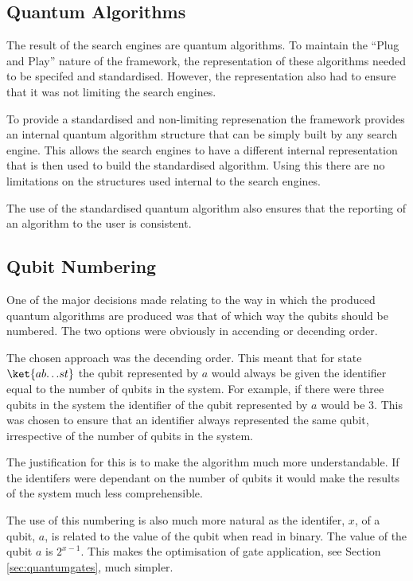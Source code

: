 \subsection{Quantum Algorithms}
The result of the search engines are quantum algorithms.
To maintain the ``Plug and Play'' nature of the framework, the representation of these algorithms needed to be specifed and standardised.
However, the representation also had to ensure that it was not limiting the search engines.

To provide a standardised and non-limiting represenation the framework provides an internal quantum algorithm structure that can be simply built by any search engine.
This allows the search engines to have a different internal representation that is then used to build the standardised algorithm.
Using this there are no limitations on the structures used internal to the search engines.

The use of the standardised quantum algorithm also ensures that the reporting of an algorithm to the user is consistent.

\subsection{Qubit Numbering}
One of the major decisions made relating to the way in which the produced quantum algorithms are produced was that of which way the qubits should be numbered.
The two options were obviously in accending or decending order.

The chosen approach was the decending order.
This meant that for state $\ket{ab{\dots}st}$ the qubit represented by $a$ would always be given the identifier equal to the number of qubits in the system.
For example, if there were three qubits in the system the identifier of the qubit represented by $a$ would be $3$.
This was chosen to ensure that an identifier always represented the same qubit, irrespective of the number of qubits in the system.

The justification for this is to make the algorithm much more understandable.
If the identifers were dependant on the number of qubits it would make the results of the system much less comprehensible.

The use of this numbering is also much more natural as the identifer, $x$, of a qubit, $a$, is related to the value of the qubit when read in binary.
The value of the qubit $a$ is $2^{x-1}$.
This makes the optimisation of gate application, see Section \ref{sec:quantumgates}, much simpler.


